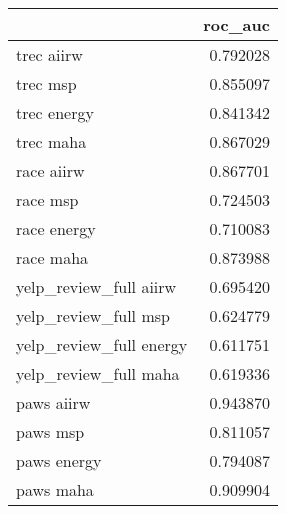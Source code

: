 \begin{tabular}{lr}
\toprule
{} &   roc\_auc \\
\midrule
trec aiirw              &  0.792028 \\
trec msp                &  0.855097 \\
trec energy             &  0.841342 \\
trec maha               &  0.867029 \\
race aiirw              &  0.867701 \\
race msp                &  0.724503 \\
race energy             &  0.710083 \\
race maha               &  0.873988 \\
yelp\_review\_full aiirw  &  0.695420 \\
yelp\_review\_full msp    &  0.624779 \\
yelp\_review\_full energy &  0.611751 \\
yelp\_review\_full maha   &  0.619336 \\
paws aiirw              &  0.943870 \\
paws msp                &  0.811057 \\
paws energy             &  0.794087 \\
paws maha               &  0.909904 \\
\bottomrule
\end{tabular}
